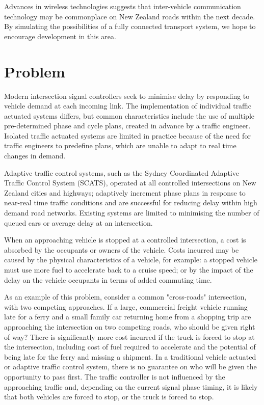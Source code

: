 Advances in wireless technologies suggests that inter-vehicle communication technology may be commonplace on New Zealand roads within the next decade. By simulating the possibilities of a fully connected transport system, we hope to encourage development in this area.

\section{Problem}

Modern intersection signal controllers seek to minimise delay by responding to vehicle demand at each incoming link. The implementation of individual traffic actuated systems differs, but common characteristics include the use of multiple pre-determined phase and cycle plans, created in advance by a traffic engineer. Isolated traffic actuated systems are limited in practice because of the need for traffic engineers to predefine plans, which are unable to adapt to real time changes in demand. 

Adaptive traffic control systems, such as the Sydney Coordinated Adaptive Traffic Control System (SCATS), operated at all controlled intersections on New Zealand cities and highways; adaptively increment phase plans in response to near-real time traffic conditions and are successful for reducing delay within high demand road networks. Existing systems are limited to minimising the number of queued cars or average delay at an intersection.

When an approaching vehicle is stopped at a controlled intersection, a cost is absorbed by the occupants or owners of the vehicle. Costs incurred may be caused by the physical characteristics of a vehicle, for example: a stopped vehicle must use more fuel to accelerate back to a cruise speed; or by the impact of the delay on the vehicle occupants in terms of added commuting time.

As an example of this problem, consider a common "cross-roads" intersection, with two competing approaches. If a large, commercial freight vehicle running late for a ferry and a small family car returning home from a shopping trip are approaching the intersection on two competing roads, who should be given right of way? There is significantly more cost incurred if the truck is forced to stop at the intersection, including cost of fuel required to accelerate and the potential of being late for the ferry and missing a shipment. In a traditional vehicle actuated or adaptive traffic control system, there is no guarantee on who will be given the opportunity to pass first. The traffic controller is not influenced by the approaching traffic and, depending on the current signal phase timing, it is likely that both vehicles are forced to stop, or the truck is forced to stop. 

